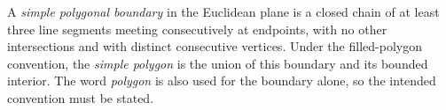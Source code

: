 
A \emph{simple polygonal boundary} in the Euclidean plane is a closed chain of at least three line segments meeting consecutively at endpoints, with no other intersections and with distinct consecutive vertices. Under the filled-polygon convention, the \emph{simple polygon} is the union of this boundary and its bounded interior. The word \emph{polygon} is also used for the boundary alone, so the intended convention must be stated.
